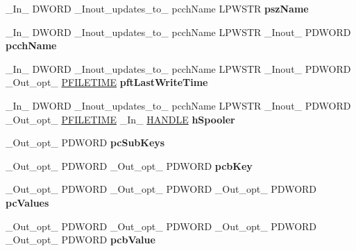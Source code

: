 \begin{DoxyCompactItemize}
\+\_\+\+In\+\_\+ D\+W\+O\+RD \+\_\+\+Inout\+\_\+updates\+\_\+to\+\_\+ pcch\+Name L\+P\+W\+S\+TR {\bfseries psz\+Name}
\item 
\mbox{\label{struct___m_o_n_i_t_o_r_r_e_g_a8f3dbc4fbcdf4e2da1d4a7b9f6039f32}} 
\+\_\+\+In\+\_\+ D\+W\+O\+RD \+\_\+\+Inout\+\_\+updates\+\_\+to\+\_\+ pcch\+Name L\+P\+W\+S\+TR \+\_\+\+Inout\+\_\+ P\+D\+W\+O\+RD {\bfseries pcch\+Name}
\item 
\mbox{\label{struct___m_o_n_i_t_o_r_r_e_g_aa090d5329a04ad0754fdecda76965ad3}} 
\+\_\+\+In\+\_\+ D\+W\+O\+RD \+\_\+\+Inout\+\_\+updates\+\_\+to\+\_\+ pcch\+Name L\+P\+W\+S\+TR \+\_\+\+Inout\+\_\+ P\+D\+W\+O\+RD \+\_\+\+Out\+\_\+opt\+\_\+ \hyperlink{struct___f_i_l_e_t_i_m_e}{P\+F\+I\+L\+E\+T\+I\+ME} {\bfseries pft\+Last\+Write\+Time}
\item 
\mbox{\label{struct___m_o_n_i_t_o_r_r_e_g_a2277eb58d6c17b50d335fe47dbfa47df}} 
\+\_\+\+In\+\_\+ D\+W\+O\+RD \+\_\+\+Inout\+\_\+updates\+\_\+to\+\_\+ pcch\+Name L\+P\+W\+S\+TR \+\_\+\+Inout\+\_\+ P\+D\+W\+O\+RD \+\_\+\+Out\+\_\+opt\+\_\+ \hyperlink{struct___f_i_l_e_t_i_m_e}{P\+F\+I\+L\+E\+T\+I\+ME} \+\_\+\+In\+\_\+ \hyperlink{interfacevoid}{H\+A\+N\+D\+LE} {\bfseries h\+Spooler}
\item 
\mbox{\label{struct___m_o_n_i_t_o_r_r_e_g_a25dc554b5dc62cdf53868fc3f6821337}} 
\+\_\+\+Out\+\_\+opt\+\_\+ P\+D\+W\+O\+RD {\bfseries pc\+Sub\+Keys}
\item 
\mbox{\label{struct___m_o_n_i_t_o_r_r_e_g_a4fb8c9d70ecb9eb404bf31f805ee7e23}} 
\+\_\+\+Out\+\_\+opt\+\_\+ P\+D\+W\+O\+RD \+\_\+\+Out\+\_\+opt\+\_\+ P\+D\+W\+O\+RD {\bfseries pcb\+Key}
\item 
\mbox{\label{struct___m_o_n_i_t_o_r_r_e_g_a6089eae79b9e967248b861ee06270d4d}} 
\+\_\+\+Out\+\_\+opt\+\_\+ P\+D\+W\+O\+RD \+\_\+\+Out\+\_\+opt\+\_\+ P\+D\+W\+O\+RD \+\_\+\+Out\+\_\+opt\+\_\+ P\+D\+W\+O\+RD {\bfseries pc\+Values}
\item 
\mbox{\label{struct___m_o_n_i_t_o_r_r_e_g_a99a04ba4b8560c4577ecec59bd207022}} 
\+\_\+\+Out\+\_\+opt\+\_\+ P\+D\+W\+O\+RD \+\_\+\+Out\+\_\+opt\+\_\+ P\+D\+W\+O\+RD \+\_\+\+Out\+\_\+opt\+\_\+ P\+D\+W\+O\+RD \+\_\+\+Out\+\_\+opt\+\_\+ P\+D\+W\+O\+RD {\bfseries pcb\+Value}

\end{DoxyCompactItemize}
